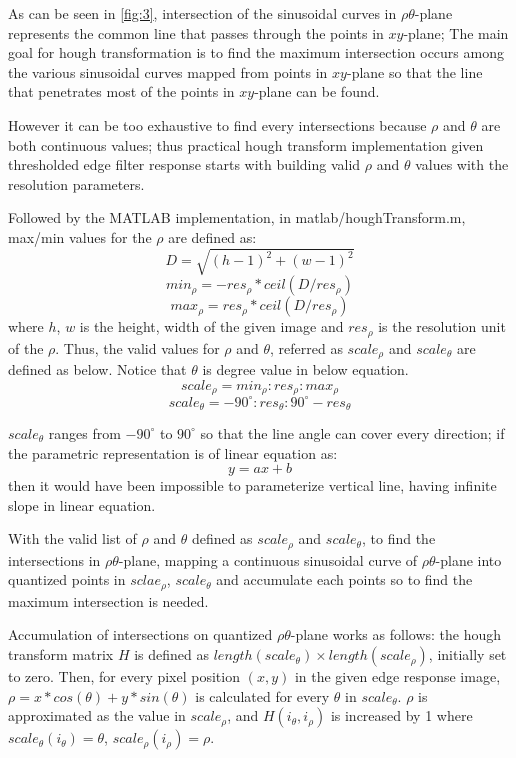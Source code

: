 \documentclass[extendedabs]{bmvc2k}
\begin{document}
As can be seen in \figurename{\ref{fig:3}}, intersection of the sinusoidal curves in $\rho\theta$-plane represents the common
line that passes through the points in $xy$-plane; The main goal for hough transformation is to find the maximum intersection 
occurs among the various sinusoidal curves mapped from points in $xy$-plane so that the line that penetrates most of the points
in $xy$-plane can be found. 

However it can be too exhaustive to find every intersections because $\rho$ and $\theta$ are both continuous values;
thus practical hough transform implementation given thresholded edge filter response starts with 
building valid $\rho$ and $\theta$ values with the resolution parameters. 

Followed by the MATLAB 
implementation, in matlab/houghTransform.m, max/min values for the $\rho$ are defined as:
\[D = \sqrt{(h-1)^2 + (w-1)^2}\]
\[min_{\rho} = -res_{\rho} * ceil(D / res_{\rho})\]
\[max_{\rho} = res_{\rho} * ceil(D / res_{\rho}) \]
where $h$, $w$ is the height, width of the given image and $res_{\rho}$ is the resolution unit of the $\rho$.
Thus, the valid values for $\rho$ and $\theta$, referred as $scale_{\rho}$ and $scale_{\theta}$ are 
defined as below. Notice that $\theta$ is degree value in below equation.
\[scale_{\rho} = min_{\rho}:res_{\rho}:max_{\rho}\]
\[scale_{\theta} = -90^\circ:res_{\theta}:90^\circ-res_{\theta}\]

$scale_{\theta}$ ranges from $-90^\circ$ to $90^\circ$ so that the line angle can cover every direction; if the 
parametric representation is of linear equation as:
\[y = ax + b\]
then it would have been impossible to parameterize vertical line, having infinite slope in linear equation.

With the valid list of $\rho$ and $\theta$ defined as $scale_{\rho}$ and $scale_{\theta}$, 
to find the intersections in $\rho\theta$-plane, mapping a continuous
sinusoidal curve of $\rho\theta$-plane into quantized points in $sclae_{\rho}$, $scale_{\theta}$ and 
accumulate each points so to find the maximum intersection is needed.

Accumulation of intersections on quantized $\rho\theta$-plane works as follows: the hough transform matrix $H$ is defined as 
$length(scale_{\theta}) \times length(scale_{\rho})$, initially set to zero.
Then, for every pixel position $(x,y)$ in the given edge response image, $\rho = x * cos(\theta) + y * sin(\theta)$ is calculated
for every $\theta$ in $scale_{\theta}$. $\rho$ is approximated as the value in $scale_{\rho}$, and $H(i_{\theta}, i_{\rho})$ is 
increased by 1 where $scale_{\theta}(i_{\theta}) = \theta$, $scale_{\rho}(i_{\rho}) = \rho$. 
\end{document}
